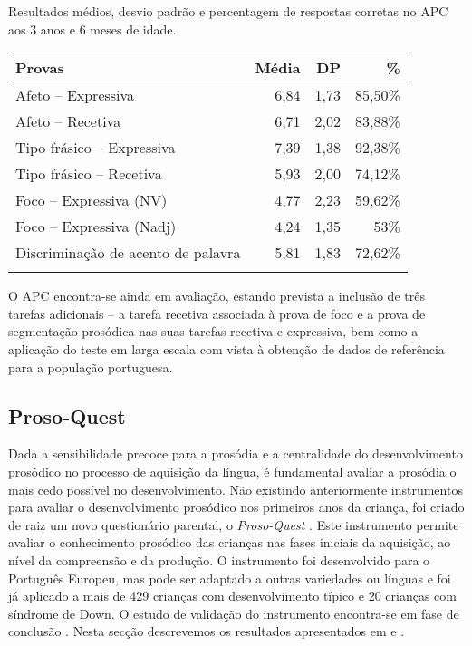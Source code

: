 \documentclass[output=paper,colorlinks,citecolor=brown,booklanguage=portuguese]{langscibook}
\begin{document}
\begin{Tabela}
\caption{Resultados médios, desvio padrão e percentagem de respostas corretas no APC aos 3 anos e 6 meses de idade.}
\label{tab:cap8tab2}


\begin{tabular}{lrrr}
\lsptoprule
 \textbf{Provas}& \textbf{Média} &\textbf{DP} & \textbf{\%}  \\
 \midrule
Afeto -- Expressiva &	6,84&	1,73&	85,50\% \\
Afeto -- Recetiva&	6,71&	2,02&	83,88\%\\
Tipo frásico -- Expressiva&	7,39&	1,38&	92,38\%\\
Tipo frásico -- Recetiva	&5,93&	2,00&	74,12\%\\
Foco -- Expressiva (NV)&	4,77&	2,23&	59,62\%\\
Foco -- Expressiva (Nadj)&	4,24&	1,35&	53\%\\
Discriminação de acento de palavra&	5,81&	1,83&	72,62\%\\
\lspbottomrule
\end{tabular}
\end{Tabela}


O APC encontra-se ainda em avaliação, estando prevista a inclusão de três tarefas adicionais -- a tarefa recetiva associada à prova de foco e a prova de segmentação prosódica nas suas tarefas recetiva e expressiva, bem como a aplicação do teste em larga escala com vista à obtenção de dados de referência para a população portuguesa.

\subsection{Proso-Quest}
Dada a sensibilidade precoce para a prosódia e a centralidade do desenvolvimento prosódico no processo de aquisição da língua, é fundamental avaliar a prosódia o mais cedo possível no desenvolvimento. Não existindo anteriormente instrumentos para avaliar o desenvolvimento prosódico nos primeiros anos da criança, foi criado de raiz um novo questionário parental, o \emph{Proso-Quest} \citep{Frota2012a}. Este instrumento permite avaliar o conhecimento prosódico das crianças nas fases iniciais da aquisição, ao nível da compreensão e da produção. O instrumento foi desenvolvido para o Português Europeu, mas pode ser adaptado a outras variedades ou línguas e foi já aplicado a mais de 429 crianças com desenvolvimento típico e 20 crianças com síndrome de Down. O estudo de validação do instrumento encontra-se em fase de conclusão \citep{Filipeempreparacao}. Nesta secção descrevemos os resultados apresentados em \citet{Vigario2015} e \citet{Filipeempreparacao}.
\end{document}
